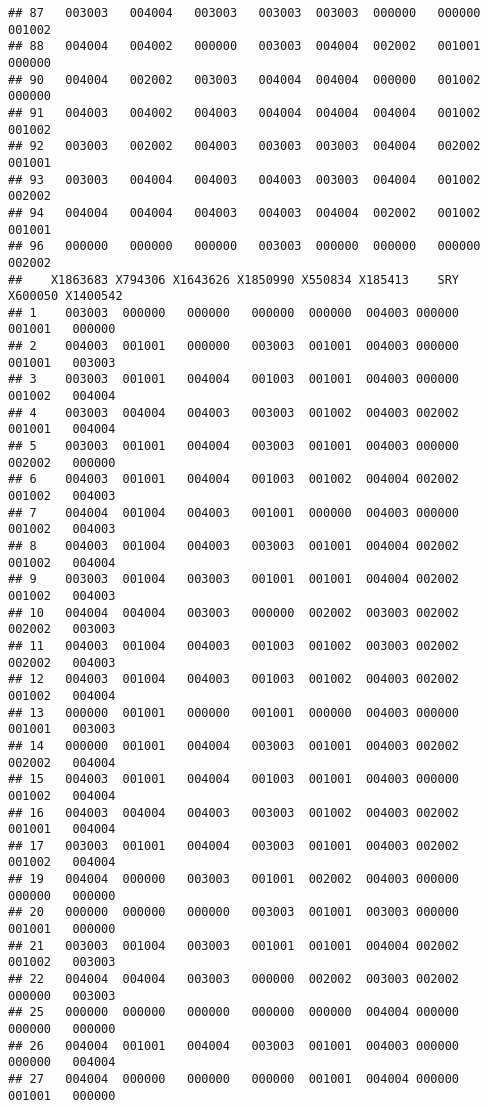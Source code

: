 \documentclass[
]{article}
\begin{document}
\begin{verbatim}
## 87   003003   004004   003003   003003  003003  000000   000000   001002
## 88   004004   004002   000000   003003  004004  002002   001001   000000
## 90   004004   002002   003003   004004  004004  000000   001002   000000
## 91   004003   004002   004003   004004  004004  004004   001002   001002
## 92   003003   002002   004003   003003  003003  004004   002002   001001
## 93   003003   004004   004003   004003  003003  004004   001002   002002
## 94   004004   004004   004003   004003  004004  002002   001002   001001
## 96   000000   000000   000000   003003  000000  000000   000000   002002
##    X1863683 X794306 X1643626 X1850990 X550834 X185413    SRY X600050 X1400542
## 1    003003  000000   000000   000000  000000  004003 000000  001001   000000
## 2    004003  001001   000000   003003  001001  004003 000000  001001   003003
## 3    003003  001001   004004   001003  001001  004003 000000  001002   004004
## 4    003003  004004   004003   003003  001002  004003 002002  001001   004004
## 5    003003  001001   004004   003003  001001  004003 000000  002002   000000
## 6    004003  001001   004004   001003  001002  004004 002002  001002   004003
## 7    004004  001004   004003   001001  000000  004003 000000  001002   004003
## 8    004003  001004   004003   003003  001001  004004 002002  001002   004004
## 9    003003  001004   003003   001001  001001  004004 002002  001002   004003
## 10   004004  004004   003003   000000  002002  003003 002002  002002   003003
## 11   004003  001004   004003   001003  001002  003003 002002  002002   004003
## 12   004003  001004   004003   001003  001002  004003 002002  001002   004004
## 13   000000  001001   000000   001001  000000  004003 000000  001001   003003
## 14   000000  001001   004004   003003  001001  004003 002002  002002   004004
## 15   004003  001001   004004   001003  001001  004003 000000  001002   004004
## 16   004003  004004   004003   003003  001002  004003 002002  001001   004004
## 17   003003  001001   004004   003003  001001  004003 002002  001002   004004
## 19   004004  000000   003003   001001  002002  004003 000000  000000   000000
## 20   000000  000000   000000   003003  001001  003003 000000  001001   000000
## 21   003003  001004   003003   001001  001001  004004 002002  001002   003003
## 22   004004  004004   003003   000000  002002  003003 002002  000000   003003
## 25   000000  000000   000000   000000  000000  004004 000000  000000   000000
## 26   004004  001001   004004   003003  001001  004003 000000  000000   004004
## 27   004004  000000   000000   000000  001001  004004 000000  001001   000000

\end{verbatim}
\end{document}
